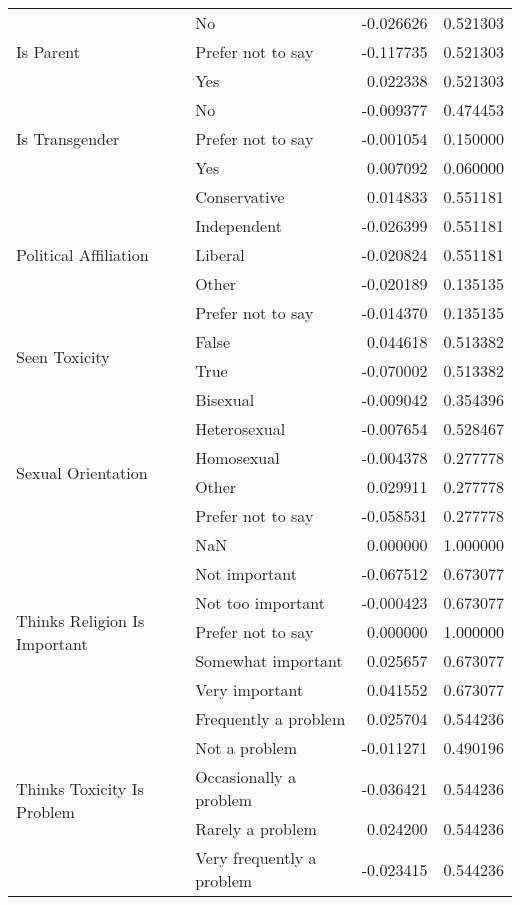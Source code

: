 \begin{longtable}{llrr}
\cline{1-4}
\multirow[t]{3}{*}{Is Parent} & No & -0.026626 & 0.521303 \\
 & Prefer not to say & -0.117735 & 0.521303 \\
 & Yes & 0.022338 & 0.521303 \\
\cline{1-4}
\multirow[t]{3}{*}{Is Transgender} & No & -0.009377 & 0.474453 \\
 & Prefer not to say & -0.001054 & 0.150000 \\
 & Yes & 0.007092 & 0.060000 \\
\cline{1-4}
\multirow[t]{5}{*}{Political Affiliation} & Conservative & 0.014833 & 0.551181 \\
 & Independent & -0.026399 & 0.551181 \\
 & Liberal & -0.020824 & 0.551181 \\
 & Other & -0.020189 & 0.135135 \\
 & Prefer not to say & -0.014370 & 0.135135 \\
\cline{1-4}
\multirow[t]{2}{*}{Seen Toxicity} & False & 0.044618 & 0.513382 \\
 & True & -0.070002 & 0.513382 \\
\cline{1-4}
\multirow[t]{6}{*}{Sexual Orientation} & Bisexual & -0.009042 & 0.354396 \\
 & Heterosexual & -0.007654 & 0.528467 \\
 & Homosexual & -0.004378 & 0.277778 \\
 & Other & 0.029911 & 0.277778 \\
 & Prefer not to say & -0.058531 & 0.277778 \\
 & NaN & 0.000000 & 1.000000 \\
\cline{1-4}
\multirow[t]{5}{*}{Thinks Religion Is Important} & Not important & -0.067512 & 0.673077 \\
 & Not too important & -0.000423 & 0.673077 \\
 & Prefer not to say & 0.000000 & 1.000000 \\
 & Somewhat important & 0.025657 & 0.673077 \\
 & Very important & 0.041552 & 0.673077 \\
\cline{1-4}
\multirow[t]{5}{*}{Thinks Toxicity Is Problem} & Frequently a problem & 0.025704 & 0.544236 \\
 & Not a problem & -0.011271 & 0.490196 \\
 & Occasionally a problem & -0.036421 & 0.544236 \\
 & Rarely a problem & 0.024200 & 0.544236 \\
 & Very frequently a problem & -0.023415 & 0.544236 \\
\cline{1-4}
\end{longtable}
